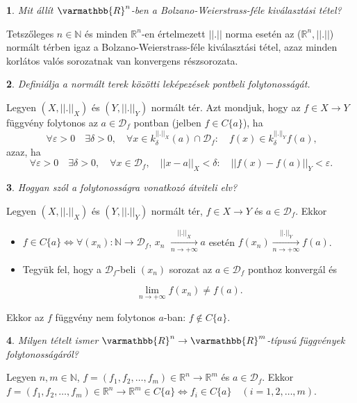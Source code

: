 \documentclass[a4paper]{article}
\def\R{\mathbb{R}}
\def\N{\mathbb{N}}
\def\RR{\varmathbb{R}}
\theoremstyle{qstyle}
\newtheorem{question}{}{}
\begin{document}
	\begin{question}
		Mit állít $\RR^n$-ben a Bolzano-Weierstrass-féle kiválasztási tétel?   
	\end{question}
	Tetszőleges $n \in \N$ és minden $\R^n$-en értelmezett $||.||$ norma esetén az ($\R^{n}, ||.||$) normált térben igaz a Bolzano-Weierstrass-féle kiválasztási tétel, azaz minden korlátos valós sorozatnak van konvergens részsorozata.
	
	\begin{question}
		Definiálja a normált terek közötti leképezések pontbeli folytonosságát.   
	\end{question}
	Legyen $(X, ||.||_{X})$ és $(Y, ||.||_{Y})$ normált tér. Azt mondjuk, hogy az $f \in X \to Y$ függvény folytonos az $a \in \mathcal{D}_{f}$ pontban (jelben $f \in C\{a\}$), ha
	$$\forall \varepsilon > 0 \quad \exists \delta > 0, \quad \forall x \in k_{\delta}^{||.||_{X}}(a) \cap \mathcal{D}_{f} : \quad f(x) \in k_{\delta}^{||.||_{Y}}f(a)\text{,}$$
	azaz, ha
	$$\forall \varepsilon > 0 \quad \exists \delta > 0, \quad \forall x \in \mathcal{D}_{f}, \quad ||x-a||_{X} < \delta : \quad ||f(x) - f(a)||_{Y} < \varepsilon \text{.}$$
	
	\begin{question}
		Hogyan szól a folytonosságra vonatkozó átviteli elv?   
	\end{question}
	Legyen $(X, ||.||_{X})$ és $(Y, ||.||_{Y})$ normált tér, $f \in X \to Y$ és $a \in \mathcal{D}_{f}$. Ekkor
	\begin{itemize}
		\item $f \in C\{a\} \Longleftrightarrow \forall (x_{n}) : \N \to \mathcal{D}_{f}$, $x_{n} $ $\xrightarrow[n \to +\infty]{||.||_{X}} a$ esetén $f(x_{n}) \xrightarrow[n \to +\infty]{||.||_{Y}} f(a)$.
		\item Tegyük fel, hogy a $\mathcal{D}_{f}$-beli $(x_{n})$ sorozat az $a \in \mathcal{D}_{f}$ ponthoz konvergál és
		
		$$\lim\limits_{n \to +\infty} f(x_{n}) \ne f(a) \text{.} $$
		
	\end{itemize}
	
	Ekkor az $f$ függvény nem folytonos $a$-ban: $f \notin C\{a\}$.
	
	\begin{question}
		Milyen tételt ismer $\RR^n \to \RR^m$-típusú függvények folytonosságáról?   
	\end{question}
	Legyen $n,m \in \N$, $f = (f_1, f_2, \dots, f_m) \in \R^n \to \R^m$ és $a \in \mathcal{D}_f$. Ekkor $f = (f_1, f_2, \dots, f_m) \in  \R^n \to \R^m \in C\{a\} \Longleftrightarrow f_i \in C\{a\} \quad (i = 1,2, \dots, m)$.
	
\end{document}
